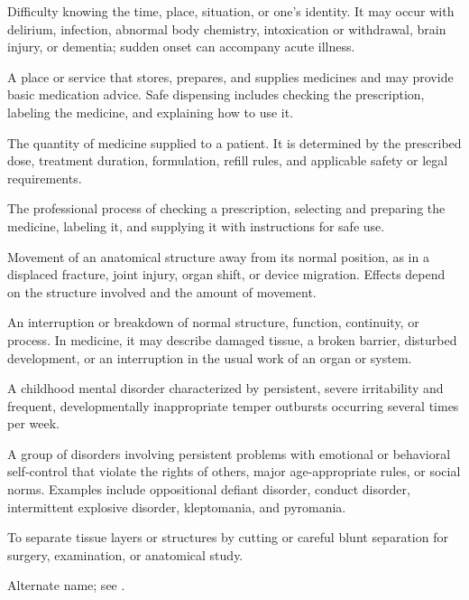  Difficulty knowing the time, place, situation, or one’s identity. It may occur with delirium, infection, abnormal body chemistry, intoxication or withdrawal, brain injury, or dementia; sudden onset can accompany acute illness.

 A place or service that stores, prepares, and supplies medicines and may provide basic medication advice. Safe dispensing includes checking the prescription, labeling the medicine, and explaining how to use it.

 The quantity of medicine supplied to a patient. It is determined by the prescribed dose, treatment duration, formulation, refill rules, and applicable safety or legal requirements.

 The professional process of checking a prescription, selecting and preparing the medicine, labeling it, and supplying it with instructions for safe use.

 Movement of an anatomical structure away from its normal position, as in a displaced fracture, joint injury, organ shift, or device migration. Effects depend on the structure involved and the amount of movement.

 An interruption or breakdown of normal structure, function, continuity, or process. In medicine, it may describe damaged tissue, a broken barrier, disturbed development, or an interruption in the usual work of an organ or system.

 A childhood mental disorder characterized by persistent, severe irritability and frequent, developmentally inappropriate temper outbursts occurring several times per week.

 A group of disorders involving persistent problems with emotional or behavioral self-control that violate the rights of others, major age-appropriate rules, or social norms. Examples include oppositional defiant disorder, conduct disorder, intermittent explosive disorder, kleptomania, and pyromania.

 To separate tissue layers or structures by cutting or careful blunt separation for surgery, examination, or anatomical study.

 Alternate name; see .

